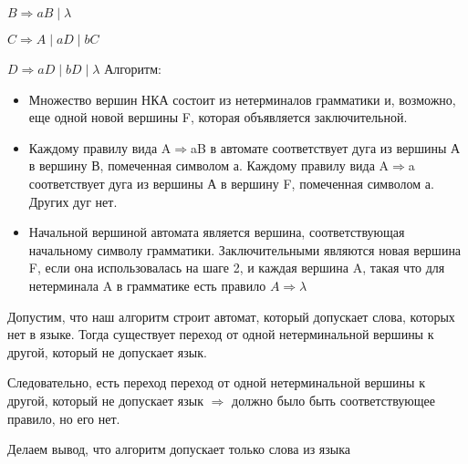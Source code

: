 \documentclass{article}
\begin{document}
    $B \Rightarrow aB\;|\;\lambda$
 
    $C \Rightarrow A\;|\;aD\;|\;bC$
 
    $D \Rightarrow aD\;|\;bD\;|\;\lambda$
\newline
{Алгоритм: }
\begin{itemize}
 \item {
    Множество   вершин   НКА   состоит   из   нетерминалов грамматики  и,  возможно, еще  одной  новой  вершины F, которая объявляется заключительной.
 }
 \item {
    Каждому  правилу  вида  A$\Rightarrow$aB  в  автомате  соответствует дуга  из  вершины А в  вершину В,  помеченная  символом а.  Каждому  правилу  вида  A$\Rightarrow$a  соответствует  дуга из  вершины А в  вершину F,  помеченная  символом а. Других дуг нет.
 }
 
 \item {
 Начальной вершиной   автомата   является   вершина, соответствующая    начальному    символу    грамматики. Заключительными    являются новая вершина F, если  она использовалась на шаге 2, и каждая вершина A, такая что для нетерминала A в грамматике есть правило  $A \Rightarrow \lambda$
 }
 
\end{itemize}
 
{Допустим, что наш алгоритм строит автомат, который допускает слова, которых нет в языке. Тогда существует  переход от одной нетерминальной вершины к другой, который не допускает язык.
 

 
  Следовательно, есть переход переход от одной нетерминальной вершины к другой, который не допускает язык $\Rightarrow$ должно было быть соответствующее правило, но его нет.
 
  Делаем вывод, что алгоритм допускает только слова из языка}
 
 
\end{document}
